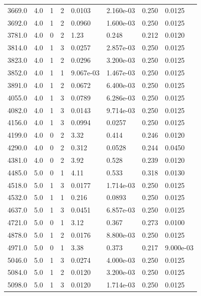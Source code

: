 \documentclass[preview]{standalone}
\begin{document}
{{{\begin{tabular}{L{1.2cm}C{1.2cm} C{0.3cm}C{0.5cm} C{1.4cm}C{1.4cm} C{1.4cm}C{1.4cm}}
  3669.0  &   4.0  & 1     &  2 &  0.0103  & 2.160e-03  & 0.250 &  0.0125   \\ 
  3692.0  &   4.0  & 1     &  2 &  0.0960  & 1.600e-03  & 0.250 &  0.0125   \\ 
  3781.0  &   4.0  & 0     &  2 &  1.23  & 0.248  & 0.212 &  0.0120   \\ 
  3814.0  &   4.0  & 1     &  3 &  0.0257  & 2.857e-03  & 0.250 &  0.0125   \\ 
  3823.0  &   4.0  & 1     &  2 &  0.0296  & 3.200e-03  & 0.250 &  0.0125   \\ 
  3852.0  &   4.0  & 1     &  1 &  9.067e-03  & 1.467e-03  & 0.250 &  0.0125   \\ 
  3891.0  &   4.0  & 1     &  2 &  0.0672  & 6.400e-03  & 0.250 &  0.0125   \\ 
  4055.0  &   4.0  & 1     &  3 &  0.0789  & 6.286e-03  & 0.250 &  0.0125   \\ 
  4082.0  &   4.0  & 1     &  3 &  0.0143  & 9.714e-03  & 0.250 &  0.0125   \\ 
  4156.0  &   4.0  & 1     &  3 &  0.0994  & 0.0257  & 0.250 &  0.0125   \\ 
  4199.0  &   4.0  & 0     &  2 &  3.32  & 0.414  & 0.246 &  0.0120   \\ 
  4290.0  &   4.0  & 0     &  2 &  0.312  & 0.0528  & 0.244 &  0.0450   \\ 
  4381.0  &   4.0  & 0     &  2 &  3.92  & 0.528  & 0.239 &  0.0120   \\ 
  4485.0  &   5.0  & 0     &  1 &  4.11  & 0.533  & 0.318 &  0.0130   \\ 
  4518.0  &   5.0  & 1     &  3 &  0.0177  & 1.714e-03  & 0.250 &  0.0125   \\ 
  4532.0  &   5.0  & 1     &  1 &  0.216  & 0.0893  & 0.250 &  0.0125   \\ 
  4637.0  &   5.0  & 1     &  3 &  0.0451  & 6.857e-03  & 0.250 &  0.0125   \\ 
  4721.0  &   5.0  & 0     &  1 &  3.12  & 0.367  & 0.273 &  0.0100   \\ 
  4878.0  &   5.0  & 1     &  2 &  0.0176  & 8.800e-03  & 0.250 &  0.0125   \\ 
  4971.0  &   5.0  & 0     &  1 &  3.38  & 0.373  & 0.217 &  9.000e-03   \\ 
  5046.0  &   5.0  & 1     &  3 &  0.0274  & 4.000e-03  & 0.250 &  0.0125   \\ 
  5084.0  &   5.0  & 1     &  2 &  0.0120  & 3.200e-03  & 0.250 &  0.0125   \\ 
  5098.0  &   5.0  & 1     &  3 &  0.0120  & 1.714e-03  & 0.250 &  0.0125   \\ 

\end{tabular}}}}
\end{document}
